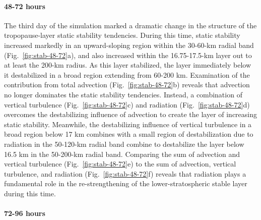 \documentclass{ametsoc}
\begin{document}
\paragraph{48-72 hours}
The third day of the simulation marked a dramatic change in the structure of the tropopause-layer static stability tendencies. During this time, static stability increased markedly in an upward-sloping region within the 30-60-km radial band (Fig.~\ref{fig:stab-48-72}a), and also increased within the 16.75-17.5-km layer out to at least the 200-km radius.
As this layer stabilized, the layer immediately below it destabilized in a broad region extending from 60-200 km.
Examination of the contribution from total advection (Fig.~\ref{fig:stab-48-72}b) reveals that advection no longer dominates the static stability tendencies.
Instead, a combination of vertical turbulence (Fig.~\ref{fig:stab-48-72}c) and radiation (Fig.~\ref{fig:stab-48-72}d) overcomes the destabilizing influence of advection to create the layer of increasing static stability.
Meanwhile, the destabilizing influence of vertical turbulence in a broad region below 17 km combines with a small region of destabilization due to radiation in the 50-120-km radial band combine to destabilize the layer below 16.5 km in the 50-200-km radial band.
Comparing the sum of advection and vertical turbulence (Fig.~\ref{fig:stab-48-72}e) to the sum of advection, vertical turbulence, and radiation (Fig.~\ref{fig:stab-48-72}f) reveals that radiation plays a fundamental role in the re-strengthening of the lower-stratospheric stable layer during this time.

\paragraph{72-96 hours}



\end{document}
